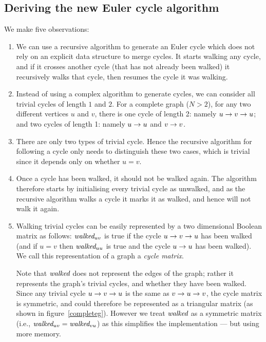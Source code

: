 \documentclass[12pt]{article}
\begin{document}
\subsection{Deriving the new Euler cycle algorithm}
\def\pair#1#2{\ifx #1#2
#1\rightarrow #2 %
\else #1\rightarrow#2\rightarrow#1\fi}

We make five observations:

\begin{enumerate}\raggedright
\item
We can use a recursive algorithm to generate an Euler cycle which does not rely on an explicit data structure to merge cycles. It starts walking any cycle, and if it crosses another cycle (that has not already been walked) it recursively walks that cycle, then resumes the cycle it was walking.

\item
Instead of using a complex algorithm to generate cycles, we can consider all trivial cycles of length $1$ and $2$. For a complete graph ($N>2$), for any two different vertices $u$ and $v$, there is one cycle of length 2: namely $\pair uv$; and two cycles of length 1: namely $\pair uu$ and $\pair vv$.

\item
There are only two types of trivial cycle. Hence the recursive algorithm for following a cycle only needs to distinguish these two cases, which is trivial since it depends only on whether $u=v$.

\item
Once a cycle has been walked, it should not be walked again. The algorithm therefore starts by initialising every trivial cycle as unwalked, and as the recursive algorithm walks a cycle it marks it as walked, and hence will not walk it again.

\item
Walking trivial cycles can be easily represented by a two dimensional Boolean matrix as follows: $\mbox{\it walked}_{uv}$ is true if the cycle $\pair uv$ has been walked (and if $u=v$ then $\mbox{\it walked}_{uu}$ is true and the cycle $\pair uu$ has been walked). We call this representation of a graph a \emph{cycle matrix}.

Note that $\mbox{\it walked}$ does not represent the edges of the graph; rather it represents the graph's trivial cycles, and whether they have been walked. Since any trivial cycle $\pair uv$ is the same as $\pair vu$, the cycle matrix is symmetric, and could therefore be represented as a triangular matrix (as shown in figure~\ref{completeg}). However we treat $\mbox{\it walked}$ as a symmetric matrix (i.e., $\mbox{\it walked}_{uv}=\mbox{\it walked}_{vu}$) as this simplifies the implementation --- but using more memory.
\end{enumerate}
\end{document}
